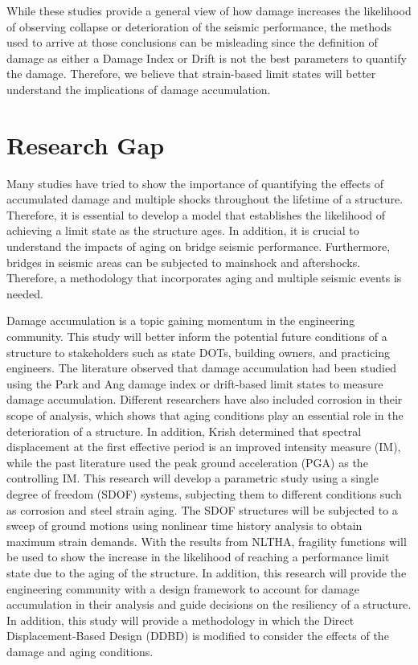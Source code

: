 While these studies provide a general view of how damage increases the likelihood of observing collapse or deterioration of the seismic performance, the methods used to arrive at those conclusions can be misleading since the definition of damage as either a Damage Index or Drift is not the best parameters to quantify the damage. Therefore, we believe that strain-based limit states will better understand the implications of damage accumulation.

\section{Research Gap}

Many studies have tried to show the importance of quantifying the effects of accumulated damage and multiple shocks throughout the lifetime of a structure. Therefore, it is essential to develop a model that establishes the likelihood of achieving a limit state as the structure ages. In addition,  it is crucial to understand the impacts of aging on bridge seismic performance. Furthermore, bridges in seismic areas can be subjected to mainshock and aftershocks. Therefore, a methodology that incorporates aging and multiple seismic events is needed.

Damage accumulation is a topic gaining momentum in the engineering community. This study will better inform the potential future conditions of a structure to stakeholders such as state DOTs, building owners, and practicing engineers. The literature observed that damage accumulation had been studied using the Park and Ang damage index or drift-based limit states to measure damage accumulation. Different researchers have also included corrosion in their scope of analysis, which shows that aging conditions play an essential role in the deterioration of a structure. In addition, Krish \cite{Krish2018} determined that spectral displacement at the first effective period is an improved intensity measure (IM), while the past literature used the peak ground acceleration (PGA) as the controlling IM. This research will develop a parametric study using a single degree of freedom (SDOF) systems, subjecting them to different conditions such as corrosion and steel strain aging. The SDOF structures will be subjected to a sweep of ground motions using nonlinear time history analysis to obtain maximum strain demands. With the results from NLTHA, fragility functions will be used to show the increase in the likelihood of reaching a performance limit state due to the aging of the structure. In addition, this research will provide the engineering community with a design framework to account for damage accumulation in their analysis and guide decisions on the resiliency of a structure. In addition, this study will provide a methodology in which the Direct Displacement-Based Design (DDBD) is modified to consider the effects of the damage and aging conditions.

